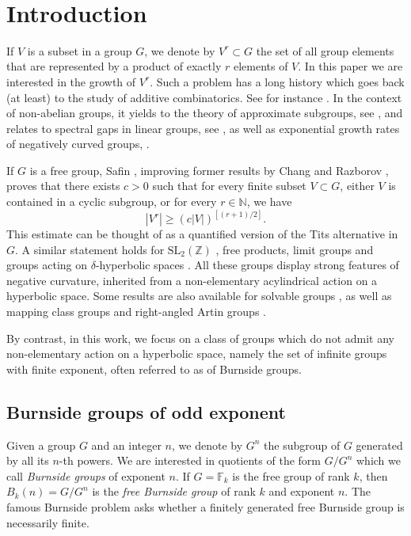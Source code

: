 
\vspace*{-4\baselineskip}
\mbox{ }
\section{Introduction}
If $V$ is a subset in a group $G$, we denote by $V^r\subset G$ the set of all group elements that are represented by a product of exactly $r$ elements of $V$.
In this paper we are interested in the growth of $V^r$.
Such a problem has a long history which goes back (at least) to the study of additive combinatorics. See for instance \cite{nathanson_additive_1996, tao_additive_2006}.
In the context of non-abelian groups, it yields to the theory of approximate subgroups, see \cite{terence_product_2008,breuillard_structure_2012}, and relates to spectral gaps in linear groups, see
\cite{helfgott_growth_2008,bourgain_spectral_2008,bourgain_spectral_2012}, as well as exponential growth rates of negatively curved groups, \cite{koubi_croissance_1998,arzhantseva_lower_2006,breuillard_joint_2018,fujiwara_rates_2020}.

If $G$ is a free group, Safin \cite{safin_powers_2011}, improving former results by Chang \cite{chang_product_2008} and Razborov \cite{razborov_product_2014}, proves that there exists $c > 0$ such that for every finite subset $V \subset G$, either $V$ is contained in a cyclic subgroup, or for every $r \in \mathbb N$, we have
\begin{equation*}
|V^r| \geq (c |V|)^{[(r+1)/2]}.
\end{equation*}
This estimate can be thought of as a quantified version of the Tits alternative in $G$.
A similar statement holds for $\mathrm{SL}_2(\mathbb{Z})$ \cite{chang_product_2008}, free products, limit groups \cite{button_explicit_2013} and groups acting on $\delta$-hyperbolic spaces \cite{delzant_product_2020}. All these groups display strong features of negative curvature, inherited from a non-elementary acylindrical action on a hyperbolic space.
Some results are also available for solvable groups \cite{tao_freiman_2010,button_explicit_2013}, as well as mapping class groups and right-angled Artin groups \cite{kerr_product_2021}.

By contrast, in this work, we focus on a class of groups which do not admit any non-elementary action on a hyperbolic space, namely the set of infinite groups with finite exponent, often referred to as of Burnside groups.

\subsection{Burnside groups of odd exponent}
Given a group $G$ and an integer $n$, we denote by $G^n$ the subgroup of $G$ generated by all its $n$-th powers.
We are interested in quotients of the form $G/G^n$ which we call \emph{Burnside groups} of exponent $n$.
If $G = \mathbb F_k$ is the free group of rank $k$, then $B_k(n) = G/G^n$ is the \emph{free Burnside group} of rank $k$ and exponent $n$.
The famous Burnside problem asks whether a finitely generated free Burnside group is necessarily finite.

